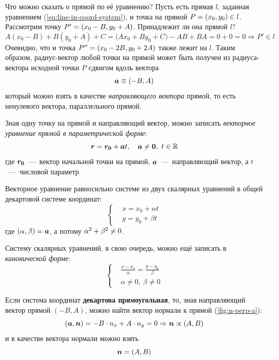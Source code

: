 \documentclass[a4paper,12pt]{article}
\begin{document}
  Что можно сказать о прямой по её уравнению?
  Пусть есть прямая $l$, заданная уравнением (\ref{eq:line-in-coord-system}), и точка на прямой $P \hm= (x_0, y_0) \hm\in l$.
  Рассмотрим точку $P' \hm= (x_0 \hm- B, y_0 \hm+ A)$.
  Принадлежит ли она прямой $l$?
  \[
    A (x_0 - B) + B (y_0 + A) + C
    = \bigl(A x_0 + B y_0 + C\bigr) - AB + BA
    = 0 + 0
    = 0
    \Rightarrow P' \in l
  \]
  Очевидно, что и точка $P'' \hm= (x_0 \hm- 2B, y_0 \hm+ 2A)$ также лежит на $l$.
  Таким образом, радиус-вектор любой точки на прямой может быть получен из радиуса-вектора исходной точки $P$ сдвигом вдоль вектора
  \begin{equation}
    \boldsymbol a \equiv (-B, A)
  \end{equation}
  который можно взять в качестве \emph{направляющего вектора} прямой, то есть ненулевого вектора, параллельного прямой.
  
  Зная одну точку на прямой и направляющий вектор, можно записать \emph{векторное уравнение прямой в параметрической форме}:
  \begin{equation}\label{eq:line-as-radius-vector}
    \boldsymbol{r} = \boldsymbol{r_0} + \boldsymbol{a} t, \quad \boldsymbol{a} \not= \boldsymbol{0},\ t \in \operatorname{\mathbb R}
  \end{equation}
  где $\boldsymbol{r_0}$~---~вектор начальной точки на прямой, $\boldsymbol a$~---~направляющий вектор, а $t$~---~числовой параметр.
  
  Векторное уравнение равносильно системе из двух скалярных уравнений в общей декартовой системе координат:
  \begin{equation}
    \left\{
      \begin{aligned}
        &x = x_0 + \alpha t\\
        &y = y_0 + \beta t
      \end{aligned}
    \right.
  \end{equation}
  где $(\alpha, \beta) \hm= \bds a$, а потому $\alpha^2 \hm+ \beta^2 \hm{\not=} 0$.
  
  Систему скалярных уравнений, в свою очередь, можно ещё записать в \emph{канонической форме}:
  \begin{equation}
    \left\{
      \begin{aligned}
        &\frac{x - x_0}{\alpha} = \frac{y - y_0}{\beta}\\
        &\alpha \not= 0,\ \beta \not= 0
      \end{aligned}
    \right.
  \end{equation}
  
  Если система координат \textbf{декартова прямоугольная}, то, зная направляющий вектор прямой $(-B, A)$, можно найти вектор нормали к прямой (\ref{fig:n-perp-a}):
  \[
    (\boldsymbol a, \boldsymbol n) = -B \cdot n_x + A \cdot n_y = 0 \Rightarrow \boldsymbol n \propto (A, B)
  \]
  и в качестве вектора нормали можно взять
  \begin{equation}
    \boldsymbol n = (A, B)
  \end{equation}
  
\end{document}
